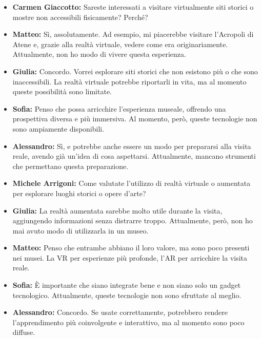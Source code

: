 \documentclass{article}
\begin{document}
\begin{itemize} 

\item \textbf{Carmen Giaccotto:} Sareste interessati a visitare virtualmente siti storici o mostre non accessibili fisicamente? Perché?

\item \textbf{Matteo:} Sì, assolutamente. Ad esempio, mi piacerebbe visitare l’Acropoli di Atene e, grazie alla realtà virtuale, vedere come era originariamente. Attualmente, non ho modo di vivere questa esperienza.

\item \textbf{Giulia:} Concordo. Vorrei esplorare siti storici che non esistono più o che sono inaccessibili. La realtà virtuale potrebbe riportarli in vita, ma al momento queste possibilità sono limitate.

\item \textbf{Sofia:} Penso che possa arricchire l’esperienza museale, offrendo una prospettiva diversa e più immersiva. Al momento, però, queste tecnologie non sono ampiamente disponibili.

\item \textbf{Alessandro:} Sì, e potrebbe anche essere un modo per prepararsi alla visita reale, avendo già un’idea di cosa aspettarsi. Attualmente, mancano strumenti che permettano questa preparazione.

\item \textbf{Michele Arrigoni:} Come valutate l’utilizzo di realtà virtuale o aumentata per esplorare luoghi storici o opere d’arte?

\item \textbf{Giulia:} La realtà aumentata sarebbe molto utile durante la visita, aggiungendo informazioni senza distrarre troppo. Attualmente, però, non ho mai avuto modo di utilizzarla in un museo.

\item \textbf{Matteo:} Penso che entrambe abbiano il loro valore, ma sono poco presenti nei musei. La VR per esperienze più profonde, l’AR per arricchire la visita reale.

\item \textbf{Sofia:} È importante che siano integrate bene e non siano solo un gadget tecnologico. Attualmente, queste tecnologie non sono sfruttate al meglio.

\item \textbf{Alessandro:} Concordo. Se usate correttamente, potrebbero rendere l’apprendimento più coinvolgente e interattivo, ma al momento sono poco diffuse.


\end{itemize}
\end{document}
